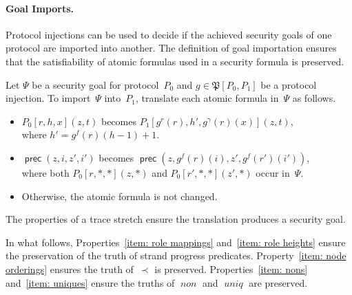 \documentclass[12pt]{article}
\newcommand{\cn}[1]{\ensuremath{\operatorname{\mathsf{#1}}}}
\newcommand{\fn}[1]{\ensuremath{\operatorname{\mathit{#1}}}}
\newcommand{\alg}[1]{\ensuremath{\mathfrak{#1}}}
\begin{document}
\paragraph{Goal Imports.}
Protocol injections can be used to decide if the achieved security
goals of one protocol are imported into another.  The definition of
goal importation ensures that the satisfiability of atomic formulas
used in a security formula is preserved.

Let $\Psi$ be a security goal for protocol~$P_0$ and
$g\in\alg{P}[P_0,P_1]$ be a protocol injection.  To import~$\Psi$
into~$P_1$, translate each atomic formula in~$\Psi$ as follows.
\begin{itemize}
\item $P_0[r,h,x](z, t)$ becomes
  $P_1[g^r(r),h',g^\gamma(r)(x)](z,t)$,\\ where $h'=g^f(r)(h-1)+1$.
\item $\cn{prec}(z,i,z',i')$ becomes
  $\cn{prec}(z,g^f(r)(i),z',g^f(r')(i'))$,\\ where both
  $P_0[r,\ast,\ast](z,\ast)$ and $P_0[r',\ast,\ast](z',\ast)$ occur
  in~$\Psi$.
\item Otherwise, the atomic formula is not changed.
\end{itemize}
The properties of a trace stretch ensure the translation produces a
security goal.

In what follows, Properties~\ref{item: role mappings} and~\ref{item:
  role heights} ensure the preservation of the truth of strand
progress predicates.  Property~\ref{item: node orderings} ensures the
truth of~$\prec$ is preserved.  Properties~\ref{item: nons}
and~\ref{item: uniques} ensure the truths of \fn{non} and \fn{uniq}
are preserved.
\end{document}
